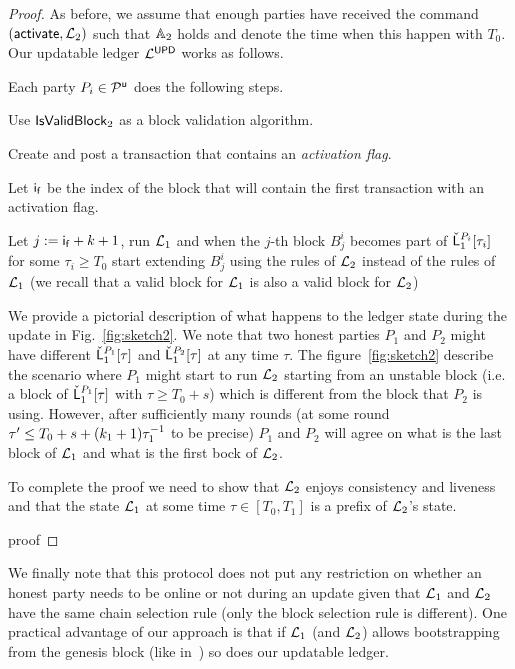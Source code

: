 \begin{proof}
As before, we assume that enough parties have received the command $(\mathsf{activate}, \mathcal{L}_2)$ such that
$\mathbb{A}_2$ holds and denote the time when this happen with $T_0$.
Our updatable ledger $\mathcal{L}^\mathsf{UPD}$ works as follows.

Each party $P_i\in\mathcal{P}^\mathsf{u}$ does the following steps.
\begin{myenumerate}
	\item Use $\mathsf{IsValidBlock}_2$ as a block validation algorithm.
	\item Create and post a transaction that contains an \emph{activation flag}. 
	\item Let $\mathsf{i_f}$ be the index of the block that will contain the first transaction with an activation flag.
	\item Let $j:=\mathsf{i_f}+k+1$, run $\mathcal{L}_1$ and when the $j$-th block $B^i_j$ becomes part of $\check {\mathsf{L}}_1^{P_i}[\tau_i]$ for some $\tau_i \geq T_0$ start extending $B^i_{j}$ using the rules of $\mathcal{L}_2$ instead of the rules of $\mathcal{L}_1$ (we recall that a valid block for $\mathcal{L}_1$ is also a valid block for $\mathcal{L}_2$)
\end{myenumerate}


We provide a pictorial description of what happens to the ledger state during the update in Fig.~\ref{fig:sketch2}.
We note that two honest parties $P_1$ and $P_2$ might have different $\check {\mathsf{L}}_1^{P_1}[\tau]$ and  $\check {\mathsf{L}}_1^{P_2}[\tau]$ at any time $\tau$. The figure~\ref{fig:sketch2}
describe the scenario where $P_1$ might start to run $\mathcal{L}_2$ starting from an 
unstable block (i.e. a block of  $\check {\mathsf{L}}_1^{P_1}[\tau]$ with $\tau\geq
T_0+s$) which is different from the block that $P_2$ is using. However, after sufficiently many
 rounds (at some round  $\tau'\leq T_0+s+(k_1+1)\tau_1^{-1}$ to be precise) $P_1$ and $P_2$ will agree on what is the last block of $\mathcal{L}_1$ and what is the first bock of $\mathcal{L}_2$.

 

To complete the proof we need to show that $\mathcal{L}_2$ enjoys consistency and liveness
and that the state $\mathcal{L}_1$ at some time $\tau\in [T_0,T_1]$ is a prefix of $\mathcal{L}_2$'s state. 


{proof}

\end{proof}



We finally note that this protocol does not put any restriction on whether an honest party needs to be online or not during an update given that $\mathcal{L}_1$ and $\mathcal{L}_2$ have the same chain selection rule (only the block selection rule is different).
One practical advantage of our approach is that if $\mathcal{L}_1$ (and $\mathcal{L}_2$) allows bootstrapping from the genesis block (like in~\cite{CCS:BGKRZ18}) so does our updatable ledger.











